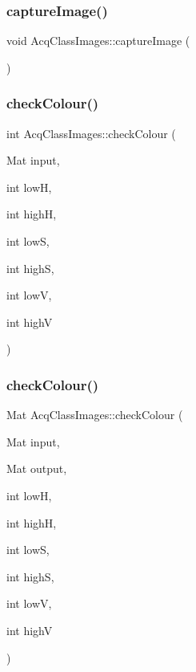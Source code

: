 \subsubsection{\texorpdfstring{capture\+Image()}{captureImage()}\hspace{0.1cm}{\footnotesize\ttfamily [4/4]}}
{\footnotesize\ttfamily void Acq\+Class\+Images\+::capture\+Image (\begin{DoxyParamCaption}{ }\end{DoxyParamCaption})\hspace{0.3cm}{\ttfamily [inline]}}

\mbox{\label{classAcqClassImages_a3387fd6ad077a0c687c152dcfbeeb957}} 
\subsubsection{\texorpdfstring{check\+Colour()}{checkColour()}\hspace{0.1cm}{\footnotesize\ttfamily [1/2]}}
{\footnotesize\ttfamily int Acq\+Class\+Images\+::check\+Colour (\begin{DoxyParamCaption}\item[{Mat}]{input,  }\item[{int}]{lowH,  }\item[{int}]{highH,  }\item[{int}]{lowS,  }\item[{int}]{highS,  }\item[{int}]{lowV,  }\item[{int}]{highV }\end{DoxyParamCaption})\hspace{0.3cm}{\ttfamily [inline]}}

\mbox{\label{classAcqClassImages_a2369614b7db2e248f2e13309b521b53b}} 
\subsubsection{\texorpdfstring{check\+Colour()}{checkColour()}\hspace{0.1cm}{\footnotesize\ttfamily [2/2]}}
{\footnotesize\ttfamily Mat Acq\+Class\+Images\+::check\+Colour (\begin{DoxyParamCaption}\item[{Mat}]{input,  }\item[{Mat}]{output,  }\item[{int}]{lowH,  }\item[{int}]{highH,  }\item[{int}]{lowS,  }\item[{int}]{highS,  }\item[{int}]{lowV,  }\item[{int}]{highV }\end{DoxyParamCaption})\hspace{0.3cm}{\ttfamily [inline]}}

